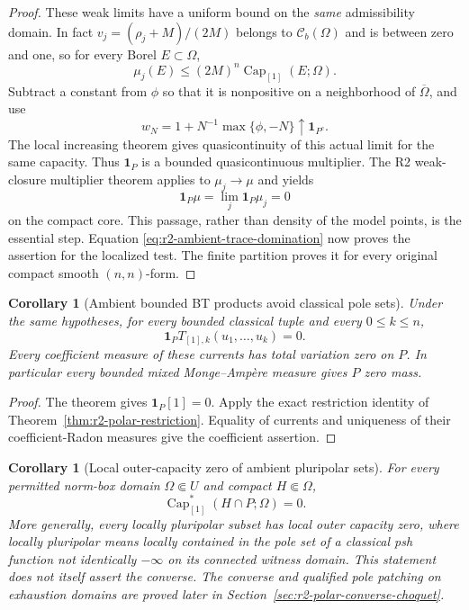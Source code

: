 \documentclass[11pt,a4paper]{article}
\numberwithin{equation}{section}
\newtheorem{corollary}[theorem]{Corollary}
\theoremstyle{definition}
\theoremstyle{remark}
\newcommand{\Cb}{\mathcal C_b}
\begin{document}
\begin{proof}
These weak limits have a uniform bound on the \emph{same}
admissibility domain. In fact
$v_j=(\rho_j+M)/(2M)$ belongs to $\Cb(\Omega)$ and is between
zero and one, so for every Borel $E\subset\Omega$,
\[
 \mu_j(E)\leq(2M)^n\operatorname{Cap}_{[1]}(E;\Omega).
\]
Subtract a constant from $\phi$ so that it is nonpositive on
a neighborhood of $\overline\Omega$, and use
\[
 w_N=1+N^{-1}\max\{\phi,-N\}\uparrow\mathbf1_{P^c}.
\]
The local increasing theorem gives quasicontinuity of this actual
limit for the same capacity. Thus $\mathbf1_P$ is a bounded
quasicontinuous multiplier. The R2 weak-closure multiplier theorem
applies to $\mu_j\to\mu$ and yields
\[
 \mathbf1_P\mu
       =\lim_j\mathbf1_P\mu_j=0
\]
on the compact core. This passage, rather than density of the
model points, is the essential step. Equation
\eqref{eq:r2-ambient-trace-domination} now proves the assertion
for the localized test. The finite partition proves it for every
original compact smooth $(n,n)$-form.
\end{proof}

\begin{corollary}[Ambient bounded BT products avoid classical pole sets]
\label{cor:r2-ambient-bt-poles}
Under the same hypotheses, for every bounded classical tuple
and every $0\leq k\leq n$,
\[
 \mathbf1_P T_{[1],k}(u_1,\ldots,u_k)=0.
\]
Every coefficient measure of these currents has total variation
zero on $P$. In particular every bounded mixed Monge--Amp\`ere
measure gives $P$ zero mass.
\end{corollary}

\begin{proof}
The theorem gives $\mathbf1_P[1]=0$. Apply the exact restriction
identity of Theorem~\ref{thm:r2-polar-restriction}. Equality of
currents and uniqueness of their coefficient-Radon measures give
the coefficient assertion.
\end{proof}

\begin{corollary}[Local outer-capacity zero of ambient pluripolar sets]
\label{cor:r2-ambient-polar-outer-zero}
For every permitted norm-box domain $\Omega\Subset U$ and
compact $H\Subset\Omega$,
\[
 \operatorname{Cap}_{[1]}^*(H\cap P;\Omega)=0.
\]
More generally, every locally pluripolar subset has local outer
capacity zero, where locally pluripolar means locally contained
in the pole set of a classical psh function not identically
$-\infty$ on its connected witness domain. This statement does
not itself assert the converse. The converse and qualified pole
patching on exhaustion domains are proved later in
Section~\ref{sec:r2-polar-converse-choquet}.
\end{corollary}
\end{document}
